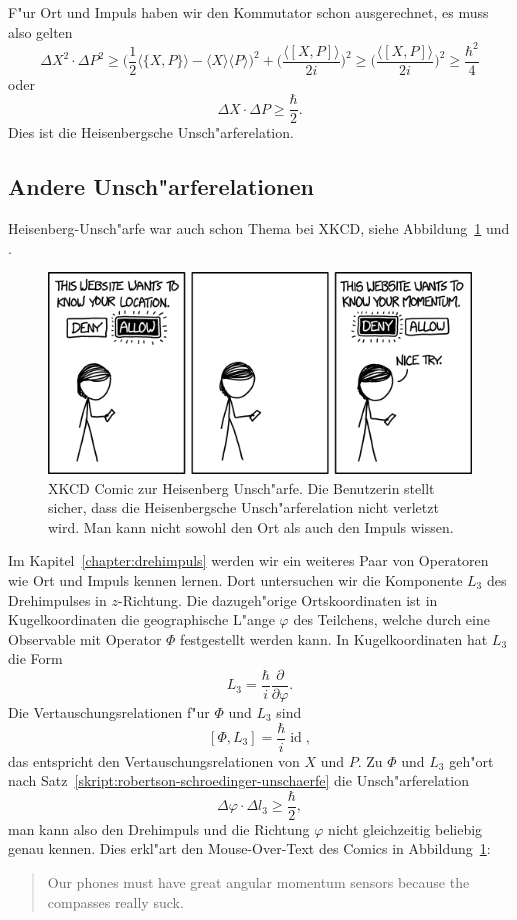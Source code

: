 F"ur Ort und Impuls haben wir den Kommutator schon ausgerechnet, es
muss also gelten
\begin{equation}
\Delta X^2\cdot \Delta P^2
\ge
\biggl(
\frac12\langle \{X,P\}\rangle - \langle X\rangle\langle P\rangle
\biggr)^2
+
\biggl(
\frac{\langle[X,P]\rangle}{2i}
\biggr)^2
\ge
\biggl(
\frac{\langle[X,P]\rangle}{2i}
\biggr)^2
\ge \frac{\hbar^2}4
\end{equation}
oder
\begin{equation}
\Delta X\cdot\Delta P\ge \frac{\hbar}2.
\end{equation}
Dies ist die Heisenbergsche Unsch"arferelation. 

\subsection{Andere Unsch"arferelationen}
Heisenberg-Unsch"arfe war auch schon Thema bei XKCD, siehe
Abbildung~\ref{skript:heisenberg:xkcd} und \cite{skript:xkcd}.
\begin{figure}
\centering
\includegraphics[width=0.8\hsize]{images/xkcd-location-sharing.png}
\caption{XKCD Comic zur Heisenberg Unsch"arfe. Die Benutzerin stellt sicher,
dass die Heisenbergsche Unsch"arferelation nicht verletzt wird. Man kann nicht
sowohl den Ort als auch den Impuls wissen.
\label{skript:heisenberg:xkcd}}
\end{figure}
Im Kapitel~\ref{chapter:drehimpuls} werden wir ein weiteres Paar
von Operatoren wie Ort und Impuls kennen lernen.
Dort untersuchen wir die Komponente $L_3$ des Drehimpulses in $z$-Richtung.
Die dazugeh"orige Ortskoordinaten ist in Kugelkoordinaten die geographische 
L"ange $\varphi$ des Teilchens, welche durch eine Observable mit Operator
$\Phi$ festgestellt werden kann.
In Kugelkoordinaten hat $L_3$ die Form
\[
L_3=\frac{\hbar}{i}\frac{\partial}{\partial\varphi}.
\]
Die Vertauschungsrelationen f"ur $\Phi$ und $L_3$ sind
\[
[\Phi,L_3]=\frac{\hbar}{i}\operatorname{id},
\]
das entspricht den Vertauschungsrelationen von $X$ und $P$.
Zu $\Phi$ und $L_3$ geh"ort nach Satz~\ref{skript:robertson-schroedinger-unschaerfe}
die Unsch"arferelation
\[
\Delta\varphi\cdot\Delta l_3 \ge \frac{\hbar}2,
\]
man kann also den Drehimpuls und die Richtung $\varphi$ nicht gleichzeitig
beliebig genau kennen.
Dies erkl"art den Mouse-Over-Text des Comics in
Abbildung~\ref{skript:heisenberg:xkcd}:
\begin{quote}
Our phones must have great angular momentum sensors because
the compasses really suck.
\end{quote}



